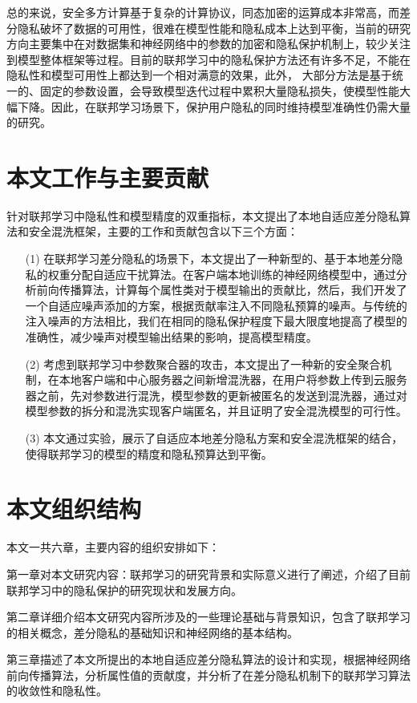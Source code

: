 总的来说，安全多方计算基于复杂的计算协议，同态加密的运算成本非常高，而差分隐私破坏了数据的可用性，很难在模型性能和隐私成本上达到平衡，当前的研究方向主要集中在对数据集和神经网络中的参数的加密和隐私保护机制上，较少关注到模型整体框架等过程。目前的联邦学习中的隐私保护方法还有许多不足，不能在隐私性和模型可用性上都达到一个相对满意的效果，此外， 大部分方法是基于统一的、固定的参数设置，会导致模型迭代过程中累积大量隐私损失，使模型性能大幅下降。因此，在联邦学习场景下，保护用户隐私的同时维持模型准确性仍需大量的研究。


\section{本文工作与主要贡献}
针对联邦学习中隐私性和模型精度的双重指标，本文提出了本地自适应差分隐私算法和安全混洗框架，主要的工作和贡献包含以下三个方面：
\begin{enumerate}
\item [(1)] 在联邦学习差分隐私的场景下，本文提出了一种新型的、基于本地差分隐私的权重分配自适应干扰算法。在客户端本地训练的神经网络模型中，通过分析前向传播算法，计算每个属性类对于模型输出的贡献比，然后，我们开发了一个自适应噪声添加的方案，根据贡献率注入不同隐私预算的噪声。与传统的注入噪声的方法相比，我们在相同的隐私保护程度下最大限度地提高了模型的准确性，减少噪声对模型输出结果的影响，提高模型精度。
\item [(2)] 考虑到联邦学习中参数聚合器的攻击，本文提出了一种新的安全聚合机制，在本地客户端和中心服务器之间新增混洗器，在用户将参数上传到云服务器之前，先对参数进行混洗，模型参数的更新被匿名的发送到混洗器，通过对模型参数的拆分和混洗实现客户端匿名，并且证明了安全混洗模型的可行性。
\item [(3)] 本文通过实验，展示了自适应本地差分隐私方案和安全混洗框架的结合，使得联邦学习的模型的精度和隐私预算达到平衡。
\end{enumerate}

\section{本文组织结构}

本文一共六章，主要内容的组织安排如下：

第一章对本文研究内容：联邦学习的研究背景和实际意义进行了阐述，介绍了目前联邦学习中的隐私保护的研究现状和发展方向。

第二章详细介绍本文研究内容所涉及的一些理论基础与背景知识，包含了联邦学习的相关概念，差分隐私的基础知识和神经网络的基本结构。

第三章描述了本文所提出的本地自适应差分隐私算法的设计和实现，根据神经网络前向传播算法，分析属性值的贡献度，并分析了在差分隐私机制下的联邦学习算法的收敛性和隐私性。
  
